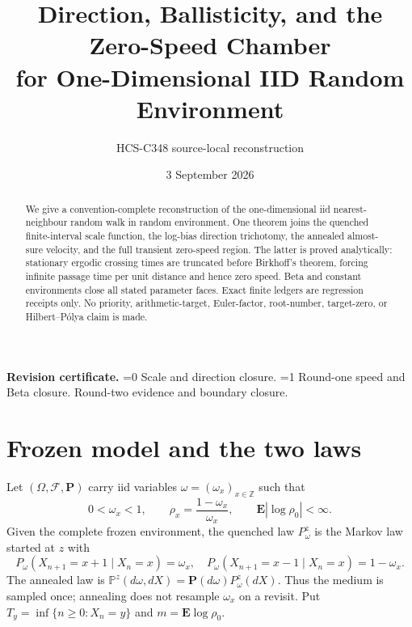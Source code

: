\documentclass[10pt]{article}
\title{Direction, Ballisticity, and the Zero-Speed Chamber\\
for One-Dimensional IID Random Environment}
\author{HCS-C348 source-local reconstruction}
\date{3 September 2026}
\providecommand{\CRevisionRound}{2}
\theoremstyle{remark}
\newcommand{\PP}{\mathbf P}
\newcommand{\EE}{\mathbf E}
\newcommand{\PA}{\mathbb P}
\begin{document}
\maketitle

\begin{abstract}
We give a convention-complete reconstruction of the one-dimensional iid
nearest-neighbour random walk in random environment.  One theorem joins the
quenched finite-interval scale function, the log-bias direction trichotomy,
the annealed almost-sure velocity, and the full transient zero-speed region.
The latter is proved analytically: stationary ergodic crossing times are
truncated before Birkhoff's theorem, forcing infinite passage time per unit
distance and hence zero speed.  Beta and constant environments close all
stated parameter faces.  Exact finite ledgers are regression receipts only.
No priority, arithmetic-target, Euler-factor, root-number, target-zero, or
Hilbert--P\'olya claim is made.
\end{abstract}

\noindent\textbf{Revision certificate.}
\ifnum\CRevisionRound=0
Scale and direction closure.
\else\ifnum\CRevisionRound=1
Round-one speed and Beta closure.
\else
Round-two evidence and boundary closure.
\fi\fi
\small

\section{Frozen model and the two laws}

Let \((\Omega,\mathcal F,\PP)\) carry iid variables
\(\omega=(\omega_x)_{x\in\mathbb Z}\) such that
\[
0<\omega_x<1,\qquad
\rho_x=\frac{1-\omega_x}{\omega_x},\qquad
\EE|\log\rho_0|<\infty.                                      \tag{1}
\]
Given the complete frozen environment, the quenched law \(P_\omega^z\) is
the Markov law started at \(z\) with
\[
P_\omega(X_{n+1}=x+1\mid X_n=x)=\omega_x,
\quad
P_\omega(X_{n+1}=x-1\mid X_n=x)=1-\omega_x.                 \tag{2}
\]
The annealed law is
\(\PA^z(d\omega,dX)=\PP(d\omega)P_\omega^z(dX)\).  Thus the
medium is sampled once; annealing does not resample \(\omega_x\) on a revisit.
Put \(T_y=\inf\{n\geq0:X_n=y\}\) and \(m=\EE\log\rho_0\).
\end{document}
